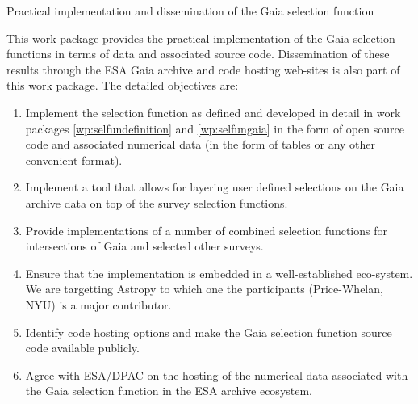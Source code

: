 \begin{workpackage}{Practical implementation and dissemination of the Gaia selection function}
  \label{wp:selfunimplementation}
  \wpend{\duration} %
 
  \makewptable %

  \begin{wpobjectives}
    This work package provides the practical implementation of the Gaia selection functions in terms of data and associated source code. Dissemination of these results through the ESA Gaia archive and code hosting web-sites is also part of this work package. The detailed objectives are:
    \begin{enumerate}
      \item Implement the selection function as defined and developed in detail in work packages \ref{wp:selfundefinition} and \ref{wp:selfungaia} in the form of open source code and associated numerical data (in the form of tables or any other convenient format).
      \item Implement a tool that allows for layering user defined selections on the Gaia archive data on top of the survey selection functions.
      \item Provide implementations of a number of combined selection functions for intersections of Gaia and selected other surveys.
      \item Ensure that the implementation is embedded in a well-established eco-system. We are targetting Astropy to which one the participants (Price-Whelan, NYU) is a major contributor.
      \item Identify code hosting options and make the Gaia selection function source code available publicly.
      \item Agree with ESA/DPAC on the hosting of the numerical data associated with the Gaia selection function in the ESA archive ecosystem.
    \end{enumerate}
  \end{wpobjectives}


\end{workpackage}
